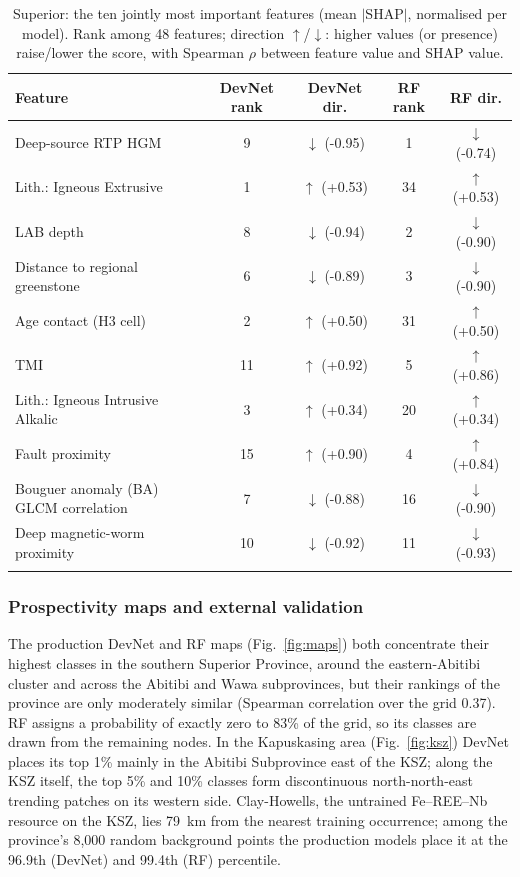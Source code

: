 \documentclass[pdflatex,sn-apa]{sn-jnl}
\begin{document}
\begin{table}[t]
\caption{Superior: the ten jointly most important features (mean $|$SHAP$|$, normalised per model). Rank among 48 features; direction $\uparrow$/$\downarrow$: higher values (or presence) raise/lower the score, with Spearman $\rho$ between feature value and SHAP value.}\label{tab:shap}
\scriptsize
\setlength{\tabcolsep}{2.5pt}
\begin{tabular*}{\textwidth}{@{\extracolsep\fill}lcccc}
\toprule
Feature & DevNet rank & DevNet dir. & RF rank & RF dir. \\
\midrule
Deep-source RTP HGM & 9 & $\downarrow$ (-0.95) & 1 & $\downarrow$ (-0.74) \\
Lith.: Igneous Extrusive & 1 & $\uparrow$ (+0.53) & 34 & $\uparrow$ (+0.53) \\
LAB depth & 8 & $\downarrow$ (-0.94) & 2 & $\downarrow$ (-0.90) \\
Distance to regional greenstone & 6 & $\downarrow$ (-0.89) & 3 & $\downarrow$ (-0.90) \\
Age contact (H3 cell) & 2 & $\uparrow$ (+0.50) & 31 & $\uparrow$ (+0.50) \\
TMI & 11 & $\uparrow$ (+0.92) & 5 & $\uparrow$ (+0.86) \\
Lith.: Igneous Intrusive Alkalic & 3 & $\uparrow$ (+0.34) & 20 & $\uparrow$ (+0.34) \\
Fault proximity & 15 & $\uparrow$ (+0.90) & 4 & $\uparrow$ (+0.84) \\
Bouguer anomaly (BA) GLCM correlation & 7 & $\downarrow$ (-0.88) & 16 & $\downarrow$ (-0.90) \\
Deep magnetic-worm proximity & 10 & $\downarrow$ (-0.92) & 11 & $\downarrow$ (-0.93) \\
\botrule
\end{tabular*}
\end{table}

\subsubsection{Prospectivity maps and external validation}\label{sec:res-maps}

The production DevNet and RF maps (Fig.~\ref{fig:maps}) both concentrate their highest classes in the southern Superior Province, around the eastern-Abitibi cluster and across the Abitibi and Wawa subprovinces, but their rankings of the province are only moderately similar (Spearman correlation over the grid 0.37). RF assigns a probability of exactly zero to 83\% of the grid, so its classes are drawn from the remaining nodes. In the Kapuskasing area (Fig.~\ref{fig:ksz}) DevNet places its top 1\% mainly in the Abitibi Subprovince east of the KSZ; along the KSZ itself, the top 5\% and 10\% classes form discontinuous north-north-east trending patches on its western side. Clay-Howells, the untrained Fe--REE--Nb resource on the KSZ, lies 79~km from the nearest training occurrence; among the province's 8,000 random background points the production models place it at the 96.9th (DevNet) and 99.4th (RF) percentile.
\end{document}

